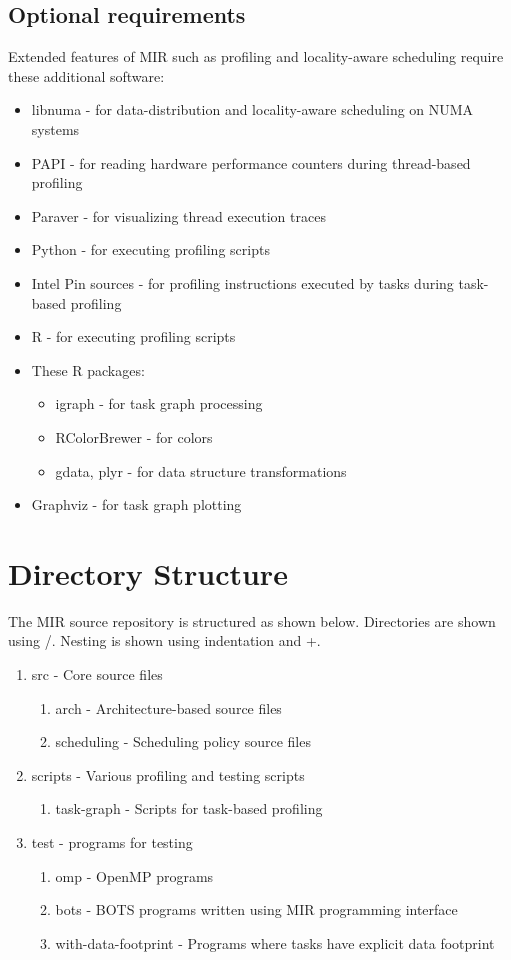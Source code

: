 \documentclass[11pt,a4paper,notitlepage]{article}
\begin{document}
\subsection{Optional requirements}
Extended features of MIR such as profiling and locality-aware scheduling require these additional software:
\begin{itemize}
\item libnuma - for data-distribution and locality-aware scheduling on NUMA systems
\item PAPI - for reading hardware performance counters during thread-based profiling
\item Paraver - for visualizing thread execution traces
\item Python - for executing profiling scripts
\item Intel Pin sources - for profiling instructions executed by tasks during task-based profiling
\item R - for executing profiling scripts
\item These R packages: 
\begin{itemize}
\item igraph - for task graph processing
\item RColorBrewer - for colors
\item gdata, plyr - for data structure transformations
\end{itemize}
\item Graphviz - for task graph plotting
\end{itemize}

\section{Directory Structure}
The MIR source repository is structured as shown below. Directories are shown using /. Nesting is shown using indentation and +.
\begin{enumerate}[/]
\item src - Core source files
    \begin{enumerate}[+/]
        \item arch - Architecture-based source files
        \item scheduling - Scheduling policy source files
    \end{enumerate}
\item scripts - Various profiling and testing scripts
    \begin{enumerate}[+/]
        \item task-graph - Scripts for task-based profiling
    \end{enumerate}
\item test - programs for testing 
    \begin{enumerate}[+/]
        \item omp - OpenMP programs
        \item bots - BOTS programs written using MIR programming interface
        \item with-data-footprint - Programs where tasks have explicit data footprint 
    \end{enumerate}
\end{enumerate}
\end{document}
